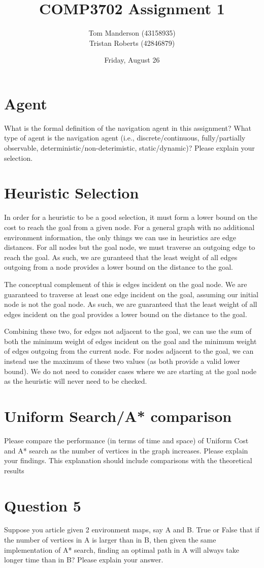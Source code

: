 \documentclass[11pt,a4paper]{article}
\title{COMP3702 Assignment 1}
\author{
Tom Manderson (43158935)
\\
Tristan Roberts (42846879)
}
\date{Friday, August 26}
\begin{document}
\maketitle
\tableofcontents
\clearpage

\section{Agent}
What is the formal definition of the navigation agent in this assignment? What type of agent is the navigation agent (i.e., discrete/continuous, fully/partially observable, deterministic/non-deterimistic, static/dynamic)? Please explain your selection.


\section{Heuristic Selection}
In order for a heuristic to be a good selection, it must form a lower bound on the cost to reach the goal from a given node. For a general graph with no additional environment information, the only things we can use in heuristics are edge distances. For all nodes but the goal node, we must traverse an outgoing edge to reach the goal. As such, we are guranteed that the least weight of all edges outgoing from a node provides a lower bound on the distance to the goal.

The conceptual complement of this is edges incident on the goal node. We are guaranteed to traverse at least one edge incident on the goal, assuming our initial node is not the goal node. As such, we are guaranteed that the least weight of all edges incident on the goal provides a lower bound on the distance to the goal.

Combining these two, for edges not adjacent to the goal, we can use the sum of both the minimum weight of edges incident on the goal and the minimum weight of edges outgoing from the current node. For nodes adjacent to the goal, we can instead use the maximum of these two values (as both provide a valid lower bound). We do not need to consider cases where we are starting at the goal node as the heuristic will never need to be checked.


\section{Uniform Search/A* comparison}
Please compare the performance (in terms of time and space) of Uniform Cost and A* search as the number of vertices in the graph increases. Please explain your findings. This explanation should include comparisons with the theoretical results


\section{Question 5}
Suppose you article given 2 environment maps, say A and B. True or False that if the number of vertices in A is larger than in B, then given the same implementation of A* search, finding an optimal path in A will always take longer time than in B? Please explain your answer.
\end{document}
